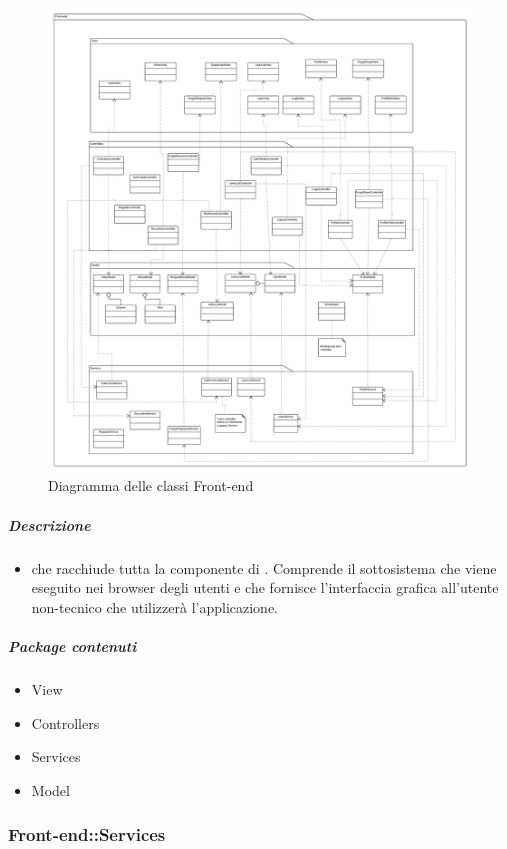 		\begin{figure}[H] 
			\begin{center} 
				\includegraphics[width=\textwidth]{uml/classi/Front-end.png}  
				\caption{Diagramma delle classi Front-end}
			\end{center}  
		\end{figure} 
		
	\subparagraph{Descrizione} 
		\begin{itemize}
		\item[]  che racchiude tutta la componente di . Comprende il sottosistema che viene eseguito nei browser degli utenti e che fornisce l'interfaccia grafica all'utente non-tecnico che utilizzerà l'applicazione.
		\end{itemize} 
		\subparagraph{Package contenuti} 
		\begin{itemize}
				\item View
				\item Controllers
				\item Services
				\item Model
		\end{itemize}
	\subsubsection{Front-end::Services}
